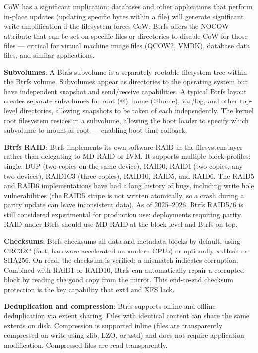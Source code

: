 CoW has a significant implication: databases and other applications that perform in-place updates (updating specific bytes within a file) will generate significant write amplification if the filesystem forces CoW. Btrfs offers the NOCOW attribute that can be set on specific files or directories to disable CoW for those files --- critical for virtual machine image files (QCOW2, VMDK), database data files, and similar applications.

\textbf{Subvolumes}: A Btrfs subvolume is a separately rootable filesystem tree within the Btrfs volume. Subvolumes appear as directories to the operating system but have independent snapshot and send/receive capabilities. A typical Btrfs layout creates separate subvolumes for root (@), home (@home), var/log, and other top-level directories, allowing snapshots to be taken of each independently. The kernel root filesystem resides in a subvolume, allowing the boot loader to specify which subvolume to mount as root --- enabling boot-time rollback.

\textbf{Btrfs RAID}: Btrfs implements its own software RAID in the filesystem layer rather than delegating to MD-RAID or LVM. It supports multiple block profiles: single, DUP (two copies on the same device), RAID0, RAID1 (two copies, any two devices), RAID1C3 (three copies), RAID10, RAID5, and RAID6. The RAID5 and RAID6 implementations have had a long history of bugs, including write hole vulnerabilities (the RAID5 stripe is not written atomically, so a crash during a parity update can leave inconsistent data). As of 2025--2026, Btrfs RAID5/6 is still considered experimental for production use; deployments requiring parity RAID under Btrfs should use MD-RAID at the block level and Btrfs on top.

\textbf{Checksums}: Btrfs checksums all data and metadata blocks by default, using CRC32C (fast, hardware-accelerated on modern CPUs) or optionally xxHash or SHA256. On read, the checksum is verified; a mismatch indicates corruption. Combined with RAID1 or RAID10, Btrfs can automatically repair a corrupted block by reading the good copy from the mirror. This end-to-end checksum protection is the key capability that ext4 and XFS lack.

\textbf{Deduplication and compression}: Btrfs supports online and offline deduplication via extent sharing. Files with identical content can share the same extents on disk. Compression is supported inline (files are transparently compressed on write using zlib, LZO, or zstd) and does not require application modification. Compressed files are read transparently.

